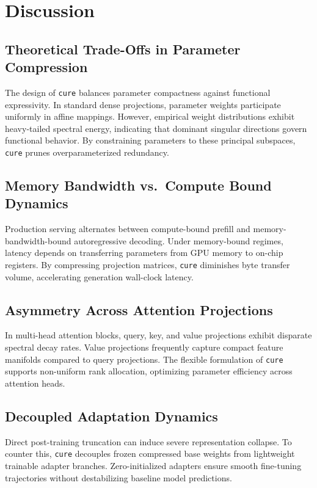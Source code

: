 \section{Discussion}

\subsection{Theoretical Trade-Offs in Parameter Compression}
The design of \texttt{cure} balances parameter compactness against functional expressivity. In standard dense projections, parameter weights participate uniformly in affine mappings. However, empirical weight distributions exhibit heavy-tailed spectral energy, indicating that dominant singular directions govern functional behavior. By constraining parameters to these principal subspaces, \texttt{cure} prunes overparameterized redundancy.

\subsection{Memory Bandwidth vs.\ Compute Bound Dynamics}
Production serving alternates between compute-bound prefill and memory-bandwidth-bound autoregressive decoding. Under memory-bound regimes, latency depends on transferring parameters from GPU memory to on-chip registers. By compressing projection matrices, \texttt{cure} diminishes byte transfer volume, accelerating generation wall-clock latency.

\subsection{Asymmetry Across Attention Projections}
In multi-head attention blocks, query, key, and value projections exhibit disparate spectral decay rates. Value projections frequently capture compact feature manifolds compared to query projections. The flexible formulation of \texttt{cure} supports non-uniform rank allocation, optimizing parameter efficiency across attention heads.

\subsection{Decoupled Adaptation Dynamics}
Direct post-training truncation can induce severe representation collapse. To counter this, \texttt{cure} decouples frozen compressed base weights from lightweight trainable adapter branches. Zero-initialized adapters ensure smooth fine-tuning trajectories without destabilizing baseline model predictions.

